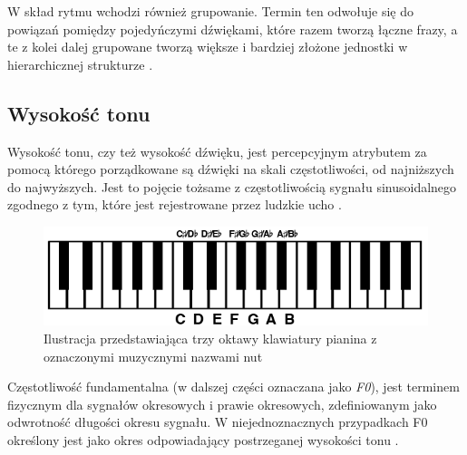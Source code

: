 \documentclass[12pt,a4paper,twoside]{mwart}
\begin{document}
W skład rytmu wchodzi również grupowanie. Termin ten odwołuje się do powiązań pomiędzy pojedyńczymi dźwiękami, które razem tworzą łączne frazy, a te z kolei dalej grupowane tworzą większe i bardziej złożone jednostki w hierarchicznej strukturze 
\cite[12-35]{Transcription:Lerdahl:GenerativeTheory}.


\subsection{Wysokość tonu}\label{sec:pitch}
Wysokość tonu, czy też wysokość dźwięku, jest percepcyjnym atrybutem za pomocą którego porządkowane są dźwięki na skali częstotliwości, od najniższych do najwyższych. Jest to pojęcie tożsame z częstotliwością sygnału sinusoidalnego zgodnego z tym, które jest rejestrowane przez ludzkie ucho 
\cite[3492-3493]{Transcription:Hartmann:PitchPeriodicityAuditoryOrganization}.

\begin{figure}[H]
  \begin{center}
    \includegraphics[scale=0.5]{images/PianoRoll.png}
    \caption{Ilustracja przedstawiająca trzy oktawy klawiatury pianina z oznaczonymi muzycznymi nazwami nut}
    \label{fig:pianoRoll}
  \end{center}
\end{figure}

Częstotliwość fundamentalna (w dalszej części oznaczana jako \textit{F0}), jest terminem fizycznym dla sygnałów okresowych i prawie okresowych, zdefiniowanym jako odwrotność długości okresu sygnału. W niejednoznacznych przypadkach F0 określony jest jako okres odpowiadający postrzeganej wysokości tonu 
\cite[8]{Transcription:Anssi:SignalProcessingMethods}.
\end{document}
